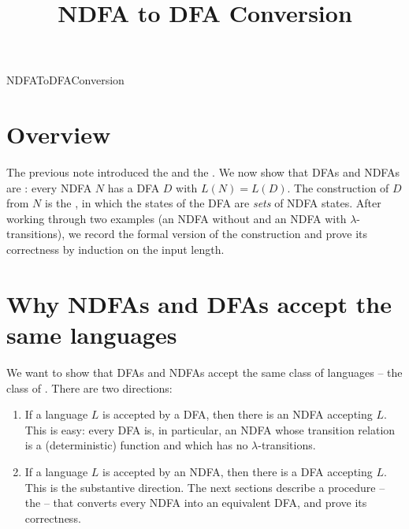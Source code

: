 \documentclass[hidelinks]{article}
\title{NDFA to DFA Conversion}
\author{}
\date{}
\begin{document}
\maketitle

\begin{smodule}[title={NDFA to DFA Conversion}]{NDFAToDFAConversion}


\section{Overview}

The previous note introduced the  and the . We now show that DFAs and NDFAs are : every NDFA $N$ has a DFA $D$ with $L(N) = L(D)$. The construction of $D$ from $N$ is the , in which the states of the DFA are \emph{sets} of NDFA states. After working through two examples (an NDFA without and an NDFA with $\lambda$-transitions), we record the formal version of the construction and prove its correctness by induction on the input length.

\section{Why NDFAs and DFAs accept the same languages}

We want to show that DFAs and NDFAs accept the same class of languages -- the class of . There are two directions:
\begin{enumerate}
  \item If a language $L$ is accepted by a DFA, then there is an NDFA accepting $L$. This is easy: every DFA is, in particular, an NDFA whose transition relation is a (deterministic) function and which has no $\lambda$-transitions.
  \item If a language $L$ is accepted by an NDFA, then there is a DFA accepting $L$. This is the substantive direction. The next sections describe a procedure -- the  -- that converts every NDFA into an equivalent DFA, and prove its correctness.
\end{enumerate}


\end{smodule}
\end{document}
